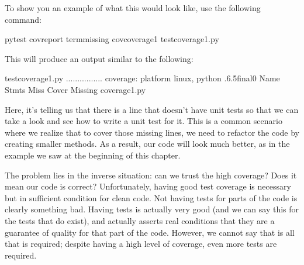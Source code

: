 \documentclass[a4paper,10pt,english]{sphinxmanual}
\begin{document}
To show you an example of what this would look like, use the following command:

\begin{sphinxVerbatim}[commandchars=\\\{\}]
pytest 
\PYGZhy{}\PYGZhy{}cov\PYGZhy{}report term\PYGZhy{}missing 
\PYGZhy{}\PYGZhy{}covcoverage\PYGZus{}1 
test\PYGZus{}coverage\PYGZus{}1.py
\end{sphinxVerbatim}

This will produce an output similar to the following:

\begin{sphinxVerbatim}[commandchars=\\\{\}]
test\PYGZus{}coverage\PYGZus{}1.py ................ \PYG{o}{[}\PYGZpc{}\PYG{o}{]}
\PYGZhy{}\PYGZhy{}\PYGZhy{}\PYGZhy{}\PYGZhy{}\PYGZhy{}\PYGZhy{}\PYGZhy{}\PYGZhy{}\PYGZhy{}\PYGZhy{} coverage: platform linux, python .6.5\PYGZhy{}final\PYGZhy{}0 \PYGZhy{}\PYGZhy{}\PYGZhy{}\PYGZhy{}\PYGZhy{}\PYGZhy{}\PYGZhy{}\PYGZhy{}\PYGZhy{}\PYGZhy{}\PYGZhy{}
Name
Stmts Miss Cover Missing
\PYGZhy{}\PYGZhy{}\PYGZhy{}\PYGZhy{}\PYGZhy{}\PYGZhy{}\PYGZhy{}\PYGZhy{}\PYGZhy{}\PYGZhy{}\PYGZhy{}\PYGZhy{}\PYGZhy{}\PYGZhy{}\PYGZhy{}\PYGZhy{}\PYGZhy{}\PYGZhy{}\PYGZhy{}\PYGZhy{}\PYGZhy{}\PYGZhy{}\PYGZhy{}\PYGZhy{}\PYGZhy{}\PYGZhy{}\PYGZhy{}\PYGZhy{}\PYGZhy{}\PYGZhy{}\PYGZhy{}\PYGZhy{}\PYGZhy{}\PYGZhy{}\PYGZhy{}\PYGZhy{}\PYGZhy{}\PYGZhy{}\PYGZhy{}\PYGZhy{}\PYGZhy{}\PYGZhy{}\PYGZhy{}\PYGZhy{}\PYGZhy{}
coverage\PYGZus{}1.py 
 \PYGZpc{}
\end{sphinxVerbatim}

Here, it’s telling us that there is a line that doesn’t have unit tests so that we can take a look
and see how to write a unit test for it. This is a common scenario where we realize that to
cover those missing lines, we need to refactor the code by creating smaller methods. As a
result, our code will look much better, as in the example we saw at the beginning of this
chapter.

The problem lies in the inverse situation: can we trust the high coverage? Does it mean our
code is correct? Unfortunately, having good test coverage is necessary but in sufficient
condition for clean code. Not having tests for parts of the code is clearly something bad.
Having tests is actually very good (and we can say this for the tests that do exist), and
actually asserts real conditions that they are a guarantee of quality for that part of the code.
However, we cannot say that is all that is required; despite having a high level of coverage,
even more tests are required.
\end{document}
